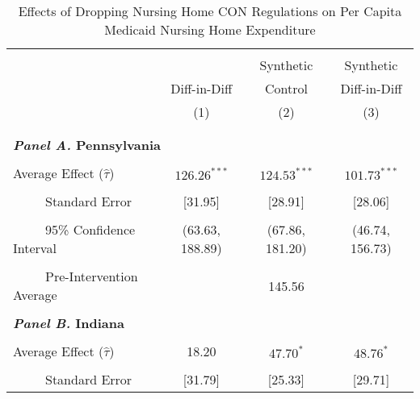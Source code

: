 \documentclass[../Main.tex]{subfiles}
\begin{document}
\newpage
\null
\vfill
\begin{table}[htbp]\centering \footnotesize
\def\sym#1{\ifmmode^{#1}\else\(^{#1}\)\fi}
\captionsetup{width=.8\textwidth}
\caption{\centering Effects of Dropping Nursing Home CON Regulations on Per Capita Medicaid Nursing Home Expenditure}
\label{tab:ave_results_med_exp_nobord_nocov}
\setlength{\tabcolsep}{10pt}
\begin{tabular}{l*{3}{c}}
\hline\hline
\\[-2ex]
&\multicolumn{1}{c}{}&\multicolumn{1}{c}{Synthetic}&\multicolumn{1}{c}{Synthetic}\\
&\multicolumn{1}{c}{Diff-in-Diff}&\multicolumn{1}{c}{Control}&\multicolumn{1}{c}{Diff-in-Diff}\\
&\multicolumn{1}{c}{(1)}&\multicolumn{1}{c}{(2)}&\multicolumn{1}{c}{(3)}\\
\\[-2ex]
\hline
\\[-.1ex]
\multicolumn{4}{l}{\textbf{\textit{Panel A.} Pennsylvania}}\\
\\[-1.5ex]
\multicolumn{1}{l}{Average Effect ($\hat{\tau}$)}&   \multicolumn{1}{c}{$126.26^{***}$}&   \multicolumn{1}{c}{$124.53^{***}$}&  \multicolumn{1}{c}{$101.73^{***}$}\\
\\[-2ex]
\multicolumn{1}{l}{\ \ \ \ \ Standard Error}  &\multicolumn{1}{c}{[31.95]}&\multicolumn{1}{c}{[28.91]}&\multicolumn{1}{c}{[28.06]}\\
\\[-2ex]
\multicolumn{1}{l}{\ \ \ \ \ 95\% Confidence Interval}&   \multicolumn{1}{c}{(63.63, 188.89)}&   \multicolumn{1}{c}{(67.86, 181.20)}&   \multicolumn{1}{c}{(46.74, 156.73)}\\
\\[-2ex]
\multicolumn{1}{l}{\ \ \ \ \ Pre-Intervention Average}&   \multicolumn{3}{c}{145.56}\\
\\[-.1ex]
\multicolumn{4}{l}{\textbf{\textit{Panel B.} Indiana}}\\
\\[-1.5ex]
\multicolumn{1}{l}{Average Effect ($\hat{\tau}$)}&   \multicolumn{1}{c}{18.20}&   \multicolumn{1}{c}{$47.70^{*}$}&  \multicolumn{1}{c}{$48.76^{*}$}\\
\\[-2ex]
\multicolumn{1}{l}{\ \ \ \ \ Standard Error}  &\multicolumn{1}{c}{[31.79]}&\multicolumn{1}{c}{[25.33]}&\multicolumn{1}{c}{[29.71]}\\

\end{tabular}
\end{table}
\end{document}
